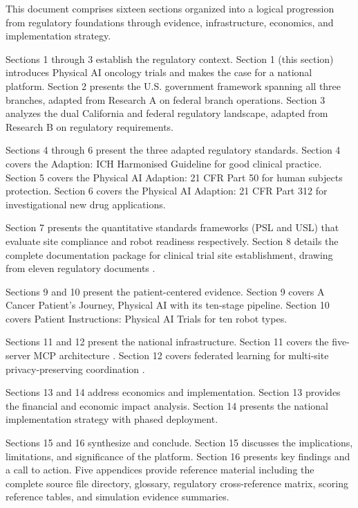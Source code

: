 This document comprises sixteen sections organized into a logical progression
from regulatory foundations through evidence, infrastructure, economics, and
implementation strategy.

Sections 1 through 3 establish the regulatory context. Section 1 (this
section) introduces Physical AI oncology trials and makes the case for a
national platform. Section 2 presents the U.S. government framework spanning
all three branches, adapted from Research A on federal branch operations.
Section 3 analyzes the dual California and federal regulatory landscape,
adapted from Research B on regulatory requirements.

Sections 4 through 6 present the three adapted regulatory standards. Section 4
covers the Adaption: ICH Harmonised Guideline \cite{ich-adapt} for good
clinical practice. Section 5 covers the Physical AI Adaption: 21 CFR Part 50
\cite{cfr50-adapt} for human subjects protection. Section 6 covers the
Physical AI Adaption: 21 CFR Part 312 \cite{cfr312-adapt} for investigational
new drug applications.

Section 7 presents the quantitative standards frameworks (PSL and USL) that
evaluate site compliance and robot readiness respectively. Section 8 details
the complete documentation package for clinical trial site establishment,
drawing from eleven regulatory documents \cite{site-docs}.

Sections 9 and 10 present the patient-centered evidence. Section 9 covers A
Cancer Patient's Journey, Physical AI \cite{patient-journey-paper} with its
ten-stage pipeline. Section 10 covers Patient Instructions: Physical AI Trials
\cite{patient-instructions-paper} for ten robot types.

Sections 11 and 12 present the national infrastructure. Section 11 covers the
five-server MCP architecture \cite{national-mcp-paper}. Section 12 covers
federated learning for multi-site privacy-preserving coordination
\cite{fl-paper}.

Sections 13 and 14 address economics and implementation. Section 13 provides
the financial and economic impact analysis. Section 14 presents the national
implementation strategy with phased deployment.

Sections 15 and 16 synthesize and conclude. Section 15 discusses the
implications, limitations, and significance of the platform. Section 16
presents key findings and a call to action. Five appendices provide reference
material including the complete source file directory, glossary, regulatory
cross-reference matrix, scoring reference tables, and simulation evidence
summaries.

